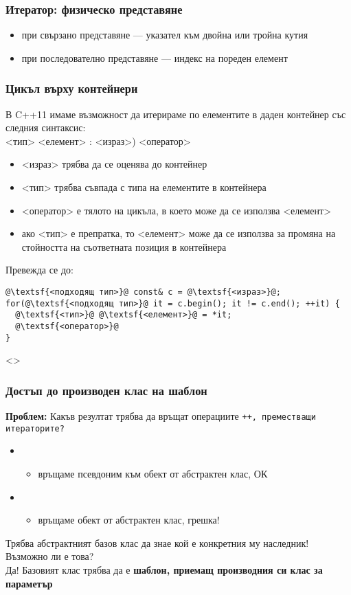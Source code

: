 \documentclass[alsotrans,beameroptions={aspectratio=169}]{beamerswitch}
\begin{document}
\begin{frame}
  \frametitle{Итератор: физическо представяне}

  \begin{itemize}
  \item при свързано представяне --- указател към двойна или тройна кутия
  \item при последователно представяне --- индекс на пореден елемент
  \end{itemize}
\end{frame}

\begin{frame}[fragile]
  \frametitle{Цикъл върху контейнери}
  В C++11 имаме възможност да итерираме по елементите в даден контейнер със следния синтаксис:\\
  <тип> <елемент> \tta: <израз>\tta) <оператор>
  \pause
  \begin{itemize}[<+->]
  \item{} <израз> трябва да се оценява до контейнер
  \item{} <тип> трябва съвпада с типа на елементите в контейнера
  \item{} <оператор> е тялото на цикъла, в което може да се използва <елемент>
  \item ако <тип> е препратка, то <елемент> може да се използва за промяна на стойността на съответната позиция в контейнера
  \end{itemize}
  \onslide<+->
  Превежда се до:
\vspace{-.5ex}
\begin{lstlisting}
@\textsf{<подходящ тип>}@ const& c = @\textsf{<израз>}@;
for(@\textsf{<подходящ тип>}@ it = c.begin(); it != c.end(); ++it) {
  @\textsf{<тип>}@ @\textsf{<елемент>}@ = *it;
  @\textsf{<оператор>}@
}
\end{lstlisting}
\end{frame}

\begin{frame}<>
  \frametitle{Достъп до производен клас на шаблон}

  \textbf{Проблем:} Какъв резултат трябва да връщат операциите \tt{++}, преместващи итераторите?\\[2ex]
  \begin{itemize}
  \item {}
    \begin{itemize}
    \item връщаме псевдоним към обект от абстрактен клас, ОК
    \end{itemize}
  \item{}
    \begin{itemize}
    \item връщаме обект от абстрактен клас, \alert{грешка!}
    \end{itemize}
  \end{itemize}
  \vspace{2ex}
  \pause
  Трябва абстрактният базов клас да знае кой е конкретния му наследник! Възможно ли е това?\\[2ex]
  \pause
  \alert{Да! Базовият клас трябва да е \textbf{шаблон, приемащ производния си клас за параметър}}
\end{frame}
\end{document}
